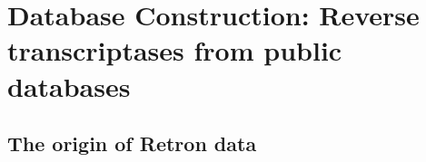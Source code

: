 

\chapter{Database Construction: Reverse transcriptases from public databases}
\label{chapter2}
\thispagestyle{empty}







\section{The origin of Retron data}
\label{sec:origin-retron-data}




